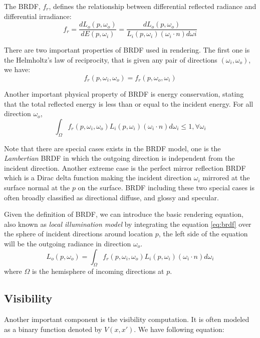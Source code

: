 The BRDF, \(f_{r}\), defines the relationship between differential reflected radiance and differential irradiance:
\begin{equation}
f_{r} = \frac{dL_{o}(p, \omega_{o})}{dE(p, \omega_{i})} = \frac{dL_{o}(p, \omega_{o})}{L_{i}(p, \omega_{i})(\omega_{i} \cdot n)d\omega{i}}
\label{eq:brdf}
\end{equation}

There are two important properties of BRDF used in rendering. The first one is the Helmholtz's law of reciprocity, that is given any pair of directions \( (\omega_{i}, \omega_{o} ) \), we have:
\begin{equation}
f_{r}(p, \omega_{i}, \omega_{o}) = f_r(p, \omega_{o}, \omega_{i})
\end{equation}

Another important physical property of BRDF is energy conservation, stating that the total reflected energy is less than or equal to the incident energy. For all direction \( \omega_{o} \),
\begin{equation}
 \int_{\Omega}f_{r}(p, \omega_{i}, \omega_{o})L_{i}(p, \omega_{i})(\omega_{i} \cdot n)d\omega_{i} \leq 1 , \forall \omega_{i}
\end{equation}

Note that there are special cases exists in the BRDF model, one is the \emph{Lambertian} BRDF in which the outgoing direction is independent from the incident direction. Another extreme case is the perfect mirror reflection BRDF which is a Dirac delta function making the incident direction \(\omega_{i}\) mirrored at the surface normal at the \(p\) on the surface. BRDF including these two special cases is often broadly classified as directional diffuse, and glossy and specular.

Given the definition of BRDF, we can introduce the basic rendering equation, also known as \emph{local illumination model} by integrating the equation \ref{eq:brdf} over the sphere of incident directions around location \(p\), the left side of the equation will be the outgoing radiance in direction \(\omega_{o}\).
\begin{equation}
L_{o}(p, \omega_{o}) = \int_{\Omega}f_{r}(p, \omega_{i}, \omega_{o})L_{i}(p, \omega_{i})(\omega_{i} \cdot n)d\omega_{i}
\label{eq:local_render_equation}
\end{equation}
where \(\Omega\) is the hemisphere of incoming directions at \(p\).

\subsection{Visibility}
Another important component is the visibility computation.
It is often modeled as a binary function denoted by \(V(x, x')\).
We have following equation:


